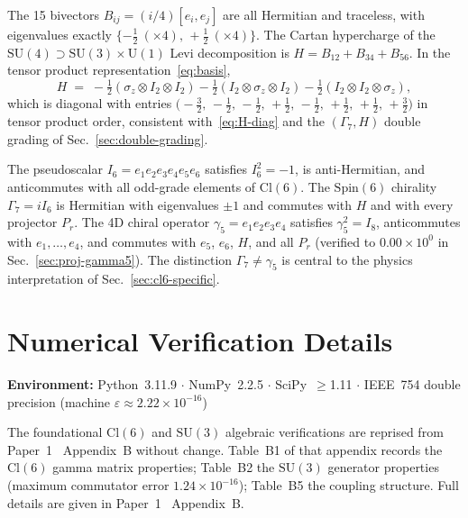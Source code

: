 \documentclass[12pt]{article}
\theoremstyle{definition}
\theoremstyle{remark}
\newcommand{\cl}{\mathrm{Cl}}           %
\newcommand{\spin}{\mathrm{Spin}}       %
\newcommand{\su}{\mathrm{SU}}           %
\newcommand{\GaSeven}{\Gamma_7}                      %
\newcommand{\Isix}{I_6}                              %
\begin{document}
	The 15 bivectors $B_{ij}=(i/4)[e_i,e_j]$ are all Hermitian and traceless,
	with eigenvalues exactly $\{-\tfrac{1}{2}\ (\times4),\,+\tfrac{1}{2}\ (\times4)\}$.
	The Cartan hypercharge of the $\su(4)\supset\su(3)\times\mathrm{U}(1)$ Levi
	decomposition is $H = B_{12}+B_{34}+B_{56}$.  In the tensor product
	representation~\eqref{eq:basis},
	\[
	H \;=\; -\tfrac{1}{2}(\sigma_z\otimes I_2\otimes I_2)
	- \tfrac{1}{2}(I_2\otimes\sigma_z\otimes I_2)
	- \tfrac{1}{2}(I_2\otimes I_2\otimes\sigma_z),
	\]
	which is diagonal with entries
	$\bigl(-\tfrac{3}{2},\,-\tfrac{1}{2},\,-\tfrac{1}{2},\,+\tfrac{1}{2},\,
	-\tfrac{1}{2},\,+\tfrac{1}{2},\,+\tfrac{1}{2},\,+\tfrac{3}{2}\bigr)$
	in tensor product order, consistent with~\eqref{eq:H-diag} and the
	$(\GaSeven,H)$ double grading of Sec.~\ref{sec:double-grading}.
	
	The pseudoscalar $\Isix = e_1e_2e_3e_4e_5e_6$ satisfies $\Isix^2 = -1$, is anti-Hermitian, and
	anticommutes with all odd-grade elements of $\cl(6)$.  The $\spin(6)$
	chirality $\GaSeven = i\Isix$ is Hermitian with eigenvalues $\pm1$ and
	commutes with $H$ and with every projector $P_r$.  The 4D chiral operator
	$\gamma_5 = e_1e_2e_3e_4$ satisfies $\gamma_5^2 = I_8$, anticommutes with
	$e_1,\ldots,e_4$, and commutes with $e_5$, $e_6$, $H$, and all $P_r$
	(verified to $0.00\times10^0$ in Sec.~\ref{sec:proj-gamma5}).  The
	distinction $\GaSeven \neq \gamma_5$ is central to the physics interpretation
	of Sec.~\ref{sec:cl6-specific}.
	
	\section{Numerical Verification Details}
	\label{app:B}
	
	\noindent\textbf{Environment:} Python~3.11.9 $\cdot$ NumPy~2.2.5 $\cdot$
	SciPy~$\geq$1.11 $\cdot$ IEEE~754 double precision
	(machine $\varepsilon \approx 2.22\times10^{-16}$)
	
	The foundational $\cl(6)$ and $\su(3)$ algebraic verifications are reprised
	from Paper~1~\cite{FirestoneP1} Appendix~B without change.  Table~B1 of that
	appendix records the $\cl(6)$ gamma matrix properties; Table~B2 the $\su(3)$
	generator properties (maximum commutator error $1.24\times10^{-16}$); Table~B5
	the coupling structure.  Full details are given in
	Paper~1~\cite{FirestoneP1} Appendix~B.
	
\end{document}
